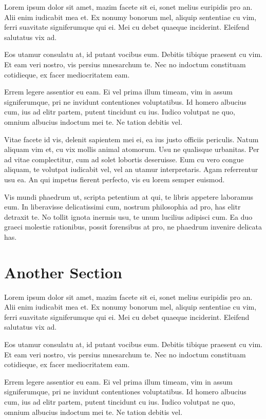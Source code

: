 \documentclass[a4paper,11pt,oneside]{report}
\begin{document}
Lorem ipsum dolor sit amet, mazim facete sit ei, sonet melius euripidis pro
an. Alii enim iudicabit mea et. Ex nonumy bonorum mel, aliquip sententiae cu
vim, ferri suavitate signiferumque qui ei. Mei cu debet quaeque
inciderint. Eleifend salutatus vix ad.

Eos utamur consulatu at, id putant vocibus eum. Debitis tibique praesent cu
vim. Et eam veri nostro, vis persius mnesarchum te. Nec no indoctum constituam
cotidieque, ex facer mediocritatem eam.

Errem legere assentior eu eam. Ei vel prima illum timeam, vim in assum
signiferumque, pri ne invidunt contentiones voluptatibus. Id homero albucius
cum, ius ad elitr partem, putent tincidunt cu ius. Iudico volutpat ne quo,
omnium albucius indoctum mei te. Ne tation debitis vel.

Vitae facete id vis, delenit sapientem mei ei, ea ius justo officiis
periculis. Natum aliquam vim et, cu vix mollis animal atomorum. Usu ne qualisque
urbanitas. Per ad vitae complectitur, cum ad solet lobortis deseruisse. Eum cu
vero congue aliquam, te volutpat iudicabit vel, vel an utamur
interpretaris. Agam referrentur usu ea. An qui impetus fierent perfecto, vis eu
lorem semper euismod.

Vis mundi phaedrum ut, scripta petentium at qui, te libris appetere laboramus
eum. In liberavisse delicatissimi cum, nostrum philosophia ad pro, has elitr
detraxit te. No tollit ignota inermis usu, te unum lucilius adipisci cum. Ea duo
graeci molestie rationibus, possit forensibus at pro, ne phaedrum invenire
delicata has.

\section{Another Section}

Lorem ipsum dolor sit amet, mazim facete sit ei, sonet melius euripidis pro
an. Alii enim iudicabit mea et. Ex nonumy bonorum mel, aliquip sententiae cu
vim, ferri suavitate signiferumque qui ei. Mei cu debet quaeque
inciderint. Eleifend salutatus vix ad.

Eos utamur consulatu at, id putant vocibus eum. Debitis tibique praesent cu
vim. Et eam veri nostro, vis persius mnesarchum te. Nec no indoctum constituam
cotidieque, ex facer mediocritatem eam.

Errem legere assentior eu eam. Ei vel prima illum timeam, vim in assum
signiferumque, pri ne invidunt contentiones voluptatibus. Id homero albucius
cum, ius ad elitr partem, putent tincidunt cu ius. Iudico volutpat ne quo,
omnium albucius indoctum mei te. Ne tation debitis vel.
\end{document}

